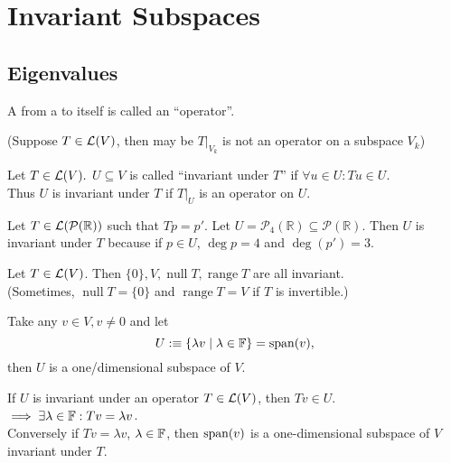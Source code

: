 \section{Invariant Subspaces}

\subsection{Eigenvalues}

\begin{mydef} [operator]
  A \lm from a \vs to itself is called an ``operator''.
\end{mydef}

(Suppose $T\in \mathcal{L}(V)$, then may be $\left.T\right|_{V_{k}}$ is not an operator on a subspace $V_k$)

\begin{mydef} 
  Let $T\in \mathcal{L}(V).$ $U \subseteq V$ is called ``invariant under $T$'' if $\forall u \in U: Tu \in U.$ \\
  Thus $U$ is invariant under $T$ if $\left.T\right|_{U}$ is an operator on $U.$
\end{mydef}

\begin{example}
  Let $T\in \mathcal{L}(\mathcal{P}(\mathbb{R}))$ such that $Tp=p'.$ Let $U=\mathcal{P}_4(\mathbb{R}) \subseteq \mathcal{P}(\mathbb{R}).$ Then $U$ is invariant under $T$
  because if $p \in U$, $\deg p = 4$ and $\deg (p')=3$.
\end{example}

\begin{example}
  Let $T\in \mathcal{L}(V)$. Then $\{0\}, V, \operatorname{null} T, \operatorname{range} T$ are all invariant. \\
  (Sometimes, $\operatorname{null} T = \{0\}$ and $\operatorname{range} T=V$ if $T$ is invertible.)
\end{example}


Take any $v\in V, v\neq 0$ and let 
\begin{equation}
  U :\equiv \{  \lambda v \mid \lambda \in \mathbb{F} \} = \operatorname{span} (v),
\end{equation}
then $U$ is a one\-/dimensional subspace of $V$. 

If $U$ is invariant under an operator $T \in \mathcal{L} (V)$, then $Tv  \in U$. $\implies \exists \lambda \in \mathbb{F}: Tv = \lambda v$. \\
Conversely if $Tv = \lambda v$, $\lambda \in \mathbb{F}$, then $\operatorname{span} (v)$ is a one-dimensional subspace of $V$ invariant under $T$.

